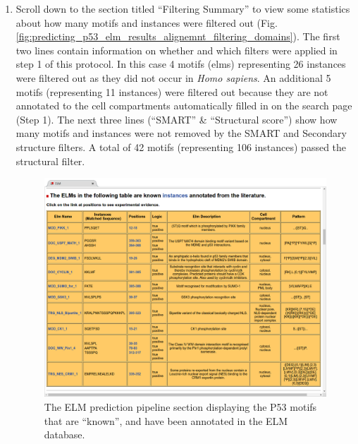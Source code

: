 \documentclass[12pt]{article}
\newcounter{proto}
\begin{document}
\begin{enumerate}
\item Scroll down to the section titled ``Filtering Summary'' to view some
	statistics about how many motifs and instances were filtered out
	(Fig.
	\ref{fig:predicting_p53_elm_results_alignemnt_filtering_domains}).
	The first two lines contain information on whether
	and which filters were applied in step 1 of this protocol.
	In this case 4 motifs (elms) representing 26 instances were filtered
	out as they did not occur in \textit{Homo sapiens}. An additional 5
	motifs (representing 11 instances) were filtered out because they are
	not annotated to the cell compartments automatically filled in on the
	search page (Step 1).
	The next three lines (``SMART'' \& ``Structural score'') show how many
	motifs and instances were not removed by the SMART and Secondary
	structure filters. A total of 42 motifs (representing 106 instances)
	passed the structural filter.


\begin{figure}[h!]
	\centering
	\includegraphics[width=\textwidth]{Figures/predicting_p53/elm_results_known.png} 
	\caption{
		The ELM prediction pipeline section displaying the P53 motifs
		that are ``known'', and have been annotated in the ELM
		database.
	}
	\label{fig:predicting_p53_elm_results_known}
\end{figure}


\end{enumerate}
\end{document}
